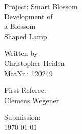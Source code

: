 \documentclass[00_doc.tex]{subfiles}
\begin{document}
    \begin{titlepage}
        \noindent
        Project: Smart Blossom
        \vspace{2em}
        \\
        {\fontsize{40}{50}\selectfont
        Development of \\[0.5em]
        a Blossom \\[0.5em]
        Shaped Lamp \\[0.5em]
        }
        \vspace*{\fill}
        \small 

        \hspace*{\fill} Written by \\
        \hspace*{\fill} Christopher Heiden \\
        \hspace*{\fill} MatNr.: 120249 \\
        \vspace{2em}

        \hspace*{\fill} First Referee:  \\
        \hspace*{\fill} Clemens Wegener \\
        \vspace{2em}

        \hspace*{\fill} Submission: \\
        \hspace*{\fill} \bkdate\today 
    \end{titlepage}
    \newpage

    \tableofcontents
    \newpage
\end{document}
